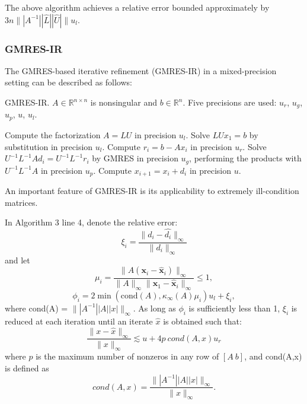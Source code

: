 The above algorithm achieves a relative error bounded approximately by $3n\||A^{-1}||\hat{L}||\hat{U}|\|u_l$\cite{Azzam2020}.


\subsubsection{GMRES-IR}
The GMRES-based iterative refinement (GMRES-IR) in a mixed-precision setting can be described as follows:

\begin{algorithm}
    \caption{GMRES-IR. $A \in \mathbb{R}^{n \times n}$ is nonsingular and $b \in \mathbb{R}^n$. Five precisions are used: $u_r$, $u_g$, $u_p$, $u$, $u_l$.}
    \begin{algorithmic}[1]
        \State Compute the factorization $A = LU$ in precision $u_l$.
        \State Solve $LUx_1 = b$ by substitution in precision $u_l$.
            \State Compute $r_i = b - Ax_i$ in precision $u_r$.
            \State Solve $U^{-1}L^{-1}Ad_i = U^{-1}L^{-1}r_i$ by GMRES in precision $u_g$, performing the products with $U^{-1}L^{-1}A$ in precision $u_p$.
            \State Compute $x_{i+1} = x_i + d_i$ in precision $u$.
        \EndFor
    \end{algorithmic}
\end{algorithm}

An important feature of GMRES-IR is its applicability to extremely ill-condition matrices.

In Algorithm 3 line 4, denote the relative error:
\[
    \xi_i = \frac{\|d_i - \hat{d_i}\|_{\infty}}{\|d_i\|_{\infty}}
\]
and let
\[
\mu_i = \frac{\|A(\mathbf{x}_i - \hat{\mathbf{x}}_i)\|_{\infty}}{\|A\|_{\infty}\|\mathbf{x}_1 - \hat{\mathbf{x}}_i\|_{\infty}} \leq 1,
\]
\[
\phi_i = 2 \min(\text{cond}(A), \kappa_{\infty}(A)\mu_i) u_l + \xi_i,
\]
where cond(A) = $\||A^{-1}||A||x|\|_\infty$.
As long as $\phi_i$ is sufficiently less than 1, $\xi_i$ is reduced at each iteration until an iterate $\hat{x}$ is obtained such that:
\[
    \frac{\|x - \hat{x}\|_{\infty}}{\|x\|_{\infty}} \lesssim u+4p\ cond(A,x)u_r
\]
where $p$ is the maximum number of nonzeros in any row of $[A\ b]$, and cond(A,x) is defined as
\[
cond(A,x)=\frac{\||A^{-1}||A||x|\|_{\infty}}{\|x\|_{\infty}}.
\]


